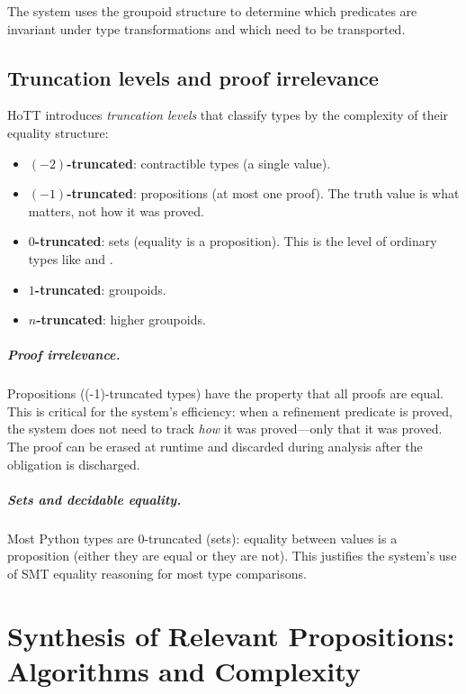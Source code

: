 \documentclass[11pt]{report}
\DeclareRobustCommand{\py}[1]{\texttt{\detokenize{#1}}}
\theoremstyle{definition}
\theoremstyle{plain}
\begin{document}
The system uses the groupoid structure to determine which predicates are
invariant under type transformations and which need to be transported.

\section{Truncation levels and proof irrelevance}

HoTT introduces \emph{truncation levels} that classify types by the
complexity of their equality structure:

\begin{itemize}[nosep]
  \item \textbf{$(-2)$-truncated}: contractible types (a single value).
  \item \textbf{$(-1)$-truncated}: propositions (at most one proof).
        The truth value is what matters, not how it was proved.
  \item \textbf{$0$-truncated}: sets (equality is a proposition).
        This is the level of ordinary types like \py{int} and \py{str}.
  \item \textbf{$1$-truncated}: groupoids.
  \item \textbf{$n$-truncated}: higher groupoids.
\end{itemize}

\paragraph{Proof irrelevance.}
Propositions ((-1)-truncated types) have the property that all proofs are
equal. This is critical for the system's efficiency: when a refinement
predicate is proved, the system does not need to track \emph{how} it was
proved---only that it was proved. The proof can be erased at runtime and
discarded during analysis after the obligation is discharged.

\paragraph{Sets and decidable equality.}
Most Python types are 0-truncated (sets): equality between values is a
proposition (either they are equal or they are not). This justifies the
system's use of SMT equality reasoning for most type comparisons.


\chapter{Synthesis of Relevant Propositions: Algorithms and Complexity}
\end{document}
